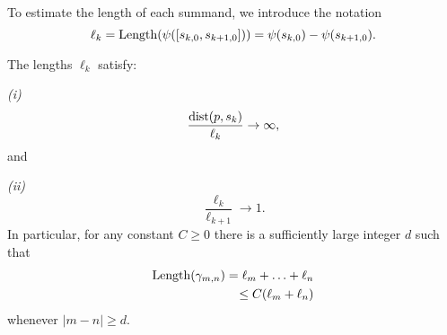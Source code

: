 

To estimate the length of each summand, we introduce the notation 
\begin{equation}
\ell_k = \operatorname{Length}(\psi([s_{k,0},s_{k+1,0}])) = \psi(s_{k,0})-\psi(s_{k+1,0}).
\end{equation}

\begin{lemma} \label{lem-ell_n}
	The lengths ${\ell_k}$ satisfy:
	
	\emph{(i)} 
	\begin{equation}
	\frac {\operatorname{dist}(p,s_k)}{\ell_k} \to \infty,
	\end{equation}
	and 
	
	\emph{(ii)} 
	\begin{equation}
		\frac{\ell_k}{\ell_{k+1}} \to 1.
	\end{equation}
	In particular, for any constant $C \geq 0$ there is a sufficiently large integer $d$ such that
	\begin{align*}
		\operatorname{Length}(\gamma_{m,n}) = \ell_{m}+\ldots+\ell_{n} \\ \leq C (\ell_m+\ell_n)
	\end{align*}
	whenever $|m-n| \geq d$.
\end{lemma}
